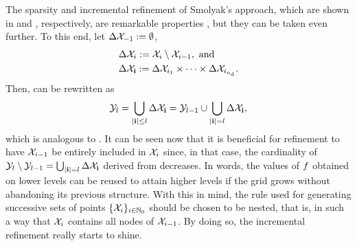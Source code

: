 The sparsity and incremental refinement of Smolyak's approach, which are shown
in  and , respectively, are
remarkable properties \perse, but they can be taken even further. To this end,
let $\Delta\mathcal{X}_{-1} := \emptyset$,
\begin{align*}
  & \Delta\mathcal{X}_i := \mathcal{X}_i \setminus \mathcal{X}_{i - 1}, \text{ and} \\
  & \Delta\mathcal{X}_{\mathbf{i}} := \Delta\mathcal{X}_{i_1} \times \cdots \times \Delta\mathcal{X}_{i_{n_\text{d}}}.
\end{align*}
Then,  can be rewritten as
\begin{equation} \elab{smolyak-grid-incremental}
  \Y_l = \bigcup_{|\vi| \leq l} \Delta\X_\vi = \Y_{l - 1} \cup \bigcup_{|\vi| = l} \Delta\X_\vi,
\end{equation}
which is analogous to . It can be seen now that it is
beneficial for refinement to have $\mathcal{X}_{i - 1}$ be entirely included in $\mathcal{X}_i$
since, in that case, the cardinality of $\mathcal{Y}_l \setminus \mathcal{Y}_{l - 1} =
\bigcup_{|\mathbf{i}| = l} \Delta\mathcal{X}_{\mathbf{i}}$ derived from 
decreases. In words, the values of $f$ obtained on lower levels can be reused
to attain higher levels if the grid grows without abandoning its previous
structure. With this in mind, the rule used for generating successive sets of
points $\{ \mathcal{X}_i \}_{i \in \mathbb{N}_0}$ should be chosen to be nested, that is, in
such a way that $\mathcal{X}_i$ contains all nodes of $\mathcal{X}_{i - 1}$. By doing so, the
incremental refinement really starts to shine.

